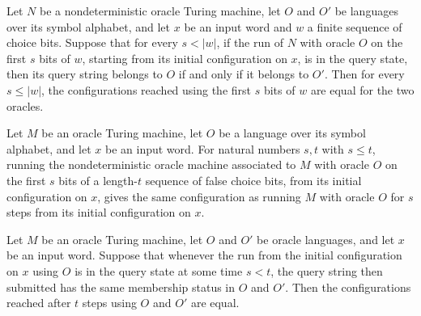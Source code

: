 \begin{theorem}
\label{Turing.OracleTM.runWith_take_eq_of_agree}
\leanok
{}
Let $N$ be a nondeterministic oracle Turing machine, let $O$ and $O'$ be languages over
its symbol alphabet, and let $x$ be an input word and $w$ a finite sequence of choice
bits. Suppose that for every $s<|w|$, if the run of $N$ with oracle $O$ on the first $s$
bits of $w$, starting from its initial configuration on $x$, is in the query state, then
its query string belongs to $O$ if and only if it belongs to $O'$. Then for every $s\le
|w|$, the configurations reached using the first $s$ bits of $w$ are equal for the two
oracles.
\end{theorem}

\begin{theorem}
\label{Turing.OracleTM.runWith_take_replicate}
\leanok
{}
Let $M$ be an oracle Turing machine, let $O$ be a language over its symbol alphabet, and
let $x$ be an input word. For natural numbers $s,t$ with $s\le t$, running the
nondeterministic oracle machine associated to $M$ with oracle $O$ on the first $s$ bits
of a length-$t$ sequence of false choice bits, from its initial configuration on $x$,
gives the same configuration as running $M$ with oracle $O$ for $s$ steps from its
initial configuration on $x$.
\end{theorem}

\begin{theorem}
\label{Turing.OracleTM.runFrom_eq_of_query_agree}
\leanok
{}
Let $M$ be an oracle Turing machine, let $O$ and $O'$ be oracle languages, and let $x$
be an input word. Suppose that whenever the run from the initial configuration on $x$
using $O$ is in the query state at some time $s<t$, the query string then submitted has
the same membership status in $O$ and $O'$. Then the configurations reached after $t$
steps using $O$ and $O'$ are equal.
\end{theorem}

